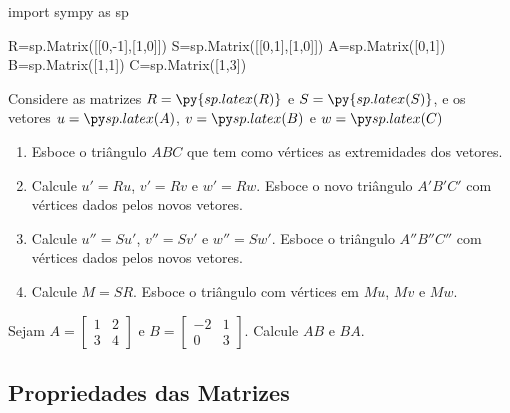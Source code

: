 \begin{frame}[label=matrizes,fragile=singleslide]
\begin{pycode}
import sympy as sp

R=sp.Matrix([[0,-1],[1,0]])
S=sp.Matrix([[0,1],[1,0]])
A=sp.Matrix([0,1])
B=sp.Matrix([1,1])
C=sp.Matrix([1,3])


\end{pycode}

\begin{casa}
Considere as matrizes  $R=\py{sp.latex(R)} $ e $S=\py{sp.latex(S)} $, e os vetores $u=\pyl{A}$, $v=\pyl{B}$ e $w=\pyl{C}$
\begin{enumerate}

\item Esboce o triângulo $ABC$ que tem como vértices as extremidades dos vetores.

\item Calcule $u'=Ru$, $v'=Rv$ e $w'=Rw$. Esboce o novo  triângulo $A'B'C'$ com vértices dados pelos novos vetores.

\item Calcule $u''=Su'$, $v''=Sv'$ e $w''=Sw'$. Esboce o triângulo $A''B''C''$ com vértices dados pelos novos vetores.

\item Calcule $M=SR$. Esboce o triângulo com vértices em $Mu$, $Mv$ e $Mw$.
\end{enumerate}
\end{casa}
\end{frame}





\begin{frame}[label=Matrizes]
\begin{casa}
Sejam 
$A=\begin{bmatrix}
1 & 2 \\
3 & 4
\end{bmatrix} $ e 
$B=\begin{bmatrix}
-2 & 1 \\
0 & 3
\end{bmatrix} $.
Calcule $AB$ e $BA$. 
\end{casa}
\end{frame}


\subsection*{Propriedades das Matrizes }

